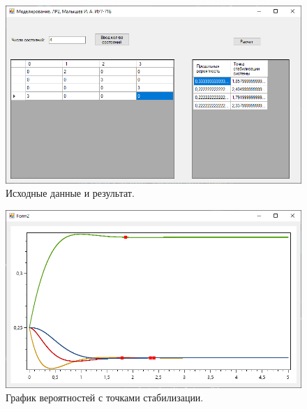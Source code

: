 \documentclass[12pt]{report}
\begin{document}
\begin{figure}[H]
	\begin{center}
		\includegraphics[scale=0.6]{imgs/res1.png}
	\end{center}
	\caption{Исходные данные и результат.}
	\label{img:res1}
\end{figure}

\begin{figure}[H]
	\begin{center}
		\includegraphics[scale=0.6]{imgs/graph1.png}
	\end{center}
	\caption{График вероятностей с точками стабилизации.}
	\label{img:graph1}
\end{figure}
\end{document}
